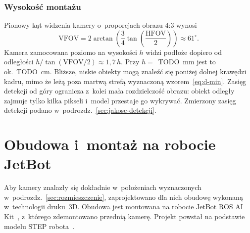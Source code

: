 \subsubsection*{Wysokość montażu}

Pionowy kąt widzenia kamery o~proporcjach obrazu 4:3 wynosi
\begin{equation}
\mathrm{VFOV}
= 2\arctan\left(
    \frac{3}{4}\tan\left(\frac{\mathrm{HFOV}}{2}\right)
  \right)
\approx 61^\circ.
\label{eq:kat-pionowy}
\end{equation}
Kamera zamocowana poziomo na wysokości $h$ widzi
podłoże dopiero od odległości $h / \tan(\mathrm{VFOV}/2) \approx 1{,}7\,h$.
Przy $h =$~TODO~mm jest to ok.~TODO~cm. Bliższe, niskie obiekty mogą
znaleźć się poniżej dolnej krawędzi kadru, mimo że leżą poza martwą
strefą wyznaczoną wzorem~\eqref{eq:d-min}. Zasięg detekcji od góry
ogranicza z~kolei mała rozdzielczość obrazu: obiekt odległy zajmuje tylko
kilka pikseli i~model przestaje go wykrywać. Zmierzony zasięg detekcji
podano w~podrozdz.~\ref{sec:jakosc-detekcji}.

\section{Obudowa i~montaż na robocie JetBot}
\label{sec:obudowa}
Aby kamery znalazły się dokładnie w~położeniach wyznaczonych
w~podrozdz.~\ref{sec:rozmieszczenie}, zaprojektowano dla nich obudowę
wykonaną w~technologii druku~3D. Obudowa jest montowana na robocie
JetBot ROS AI Kit~\cite{waveshare_jetbot_ros}, z~którego zdemontowano
przednią kamerę. Projekt powstał na podstawie modelu STEP
robota~\cite{waveshare_jetbot_ros_3d}.

